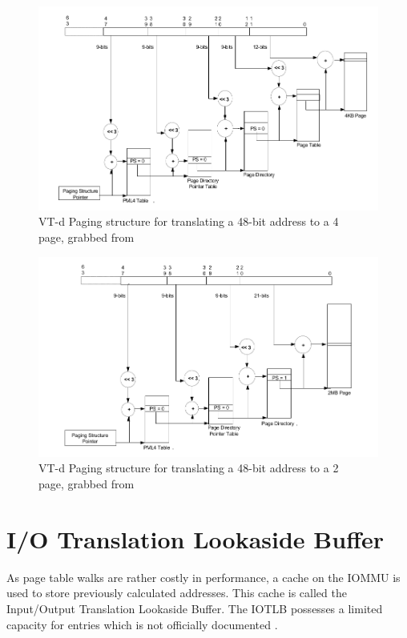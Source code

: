 \begin{figure}
    \centering
    \includegraphics[width=\textwidth]{figures/4kibtranslation.pdf}
    \caption{VT-d Paging structure for translating a 48-bit address to a \qty{4}{\kibi\byte} page, grabbed from \cite{vtdspec}}
    \label{fig:pagewalk4kib}
\end{figure}
\begin{figure}
    \centering
    \includegraphics[width=\textwidth]{figures/2mibtranslation.pdf}
    \caption{VT-d Paging structure for translating a 48-bit address to a \qty{2}{\mebi\byte} page, grabbed from \cite{vtdspec}}
    \label{fig:pagewalk2mib}
\end{figure}

\section{I/O Translation Lookaside Buffer}
As page table walks are rather costly in performance, a cache on the IOMMU is used to store previously calculated addresses. This cache is called the Input/Output Translation Lookaside Buffer. The IOTLB possesses a limited capacity for entries which is not officially documented \cite{iommuhuber}.

